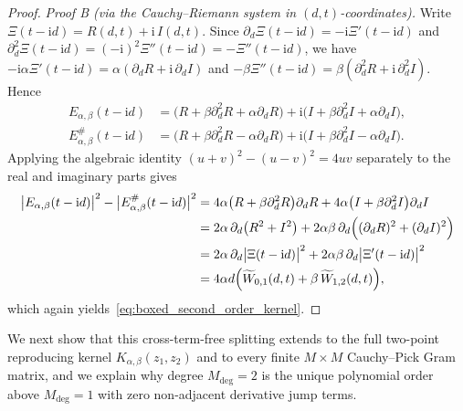\documentclass[11pt,reqno]{amsart}
\theoremstyle{definition}
\theoremstyle{remark}
\numberwithin{equation}{section}
\newcommand{\ii}{\mathrm{i}}
\begin{document}
\begin{proof}
\textit{Proof B (via the Cauchy--Riemann system in $(d,t)$-coordinates).} Write $\Xi(t-\ii d) = R(d,t) + \ii\,I(d,t)$. Since $\partial_d \Xi(t-\ii d) = -\ii\Xi'(t-\ii d)$ and $\partial_d^2\Xi(t-\ii d) = (-\ii)^2\Xi''(t-\ii d) = -\Xi''(t-\ii d)$, we have $-\ii\alpha\Xi'(t-\ii d) = \alpha(\partial_d R + \ii\,\partial_d I)$ and $-\beta\Xi''(t-\ii d) = \beta(\partial_d^2 R + \ii\,\partial_d^2 I)$. Hence
\begin{align*}
E_{\alpha,\beta}(t-\ii d) &= \bigl(R + \beta\partial_d^2 R + \alpha\partial_d R\bigr) + \ii\bigl(I + \beta\partial_d^2 I + \alpha\partial_d I\bigr), \\
E_{\alpha,\beta}^\#(t-\ii d) &= \bigl(R + \beta\partial_d^2 R - \alpha\partial_d R\bigr) + \ii\bigl(I + \beta\partial_d^2 I - \alpha\partial_d I\bigr).
\end{align*}
Applying the algebraic identity $(u+v)^2 - (u-v)^2 = 4uv$ separately to the real and imaginary parts gives
\begin{align*}
\bigl|E_{\alpha,\beta}(t-\ii d)\bigr|^2 - \bigl|E_{\alpha,\beta}^\#(t-\ii d)\bigr|^2 &= 4\alpha\bigl(R + \beta\partial_d^2 R\bigr)\partial_d R + 4\alpha\bigl(I + \beta\partial_d^2 I\bigr)\partial_d I \\
&= 2\alpha\,\partial_d\bigl(R^2 + I^2\bigr) + 2\alpha\beta\,\partial_d\Bigl((\partial_d R)^2 + (\partial_d I)^2\Bigr) \\
&= 2\alpha\,\partial_d\bigl|\Xi(t-\ii d)\bigr|^2 + 2\alpha\beta\,\partial_d\bigl|\Xi'(t-\ii d)\bigr|^2 \\
&= 4\alpha d\Bigl(\widetilde{W}_{0,1}(d,t) + \beta\,\widetilde{W}_{1,2}(d,t)\Bigr),
\end{align*}
which again yields~\eqref{eq:boxed_second_order_kernel}.
\end{proof}

We next show that this cross-term-free splitting extends to the full two-point reproducing kernel $K_{\alpha,\beta}(z_1, z_2)$ and to every finite $M \times M$ Cauchy--Pick Gram matrix, and we explain why degree $M_{\mathrm{deg}} = 2$ is the unique polynomial order above $M_{\mathrm{deg}} = 1$ with zero non-adjacent derivative jump terms.
\end{document}

